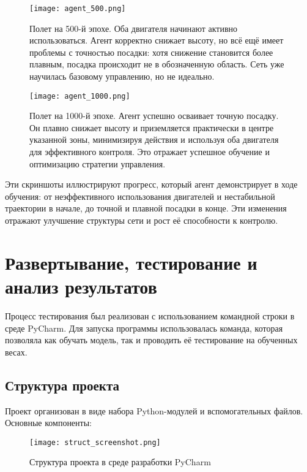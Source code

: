 \documentclass[a4paper,12pt]{article}
\begin{document}
\begin{figure}[H]
	\centering
	\texttt{[image: agent\_500.png]}
	\caption{Полет на 500-й эпохе. Оба двигателя начинают активно использоваться. Агент корректно снижает высоту, но всё ещё имеет проблемы с точностью посадки: хотя снижение становится более плавным, посадка происходит не в обозначенную область. Сеть уже научилась базовому управлению, но не идеально.}
	\label{fig:landing_epoch500}
\end{figure}

\begin{figure}[H]
	\centering
	\texttt{[image: agent\_1000.png]}
	\caption{Полет на 1000-й эпохе. Агент успешно осваивает точную посадку. Он плавно снижает высоту и приземляется практически в центре указанной зоны, минимизируя действия и используя оба двигателя для эффективного контроля. Это отражает успешное обучение и оптимизацию стратегии управления.}
	\label{fig:landing_epoch1000}
\end{figure}

Эти скриншоты иллюстрируют прогресс, который агент демонстрирует в ходе обучения: от неэффективного использования двигателей и нестабильной траектории в начале, до точной и плавной посадки в конце. Эти изменения отражают улучшение структуры сети и рост её способности к контролю.
\newpage
\section{Развертывание, тестирование и анализ результатов}

Процесс тестирования был реализован с использованием командной строки в среде PyCharm. Для запуска программы использовалась команда, которая позволяла как обучать модель, так и проводить её тестирование на обученных весах.

\subsection{Структура проекта}

Проект организован в виде набора Python-модулей и вспомогательных файлов. Основные компоненты:

\begin{figure}[H]
	\centering
	\texttt{[image: struct\_screenshot.png]}
	\caption{Структура проекта в среде разработки PyCharm}
	\label{fig:struct_screenshot}
\end{figure}
\end{document}
